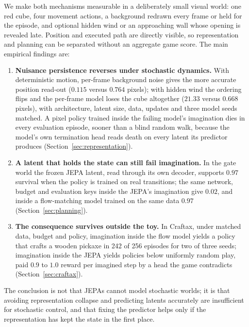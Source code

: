 We make both mechanisms measurable in a deliberately small visual world: one red cube, four
movement actions, a background redrawn every frame or held for the episode, and optional hidden
wind or an approaching wall whose opening is revealed late. Position and executed path are directly
visible, so representation and planning can be separated without an aggregate game score. The main
empirical findings are:
\begin{enumerate}
\item \textbf{Nuisance persistence reverses under stochastic dynamics.} With deterministic motion,
per-frame background noise gives the more accurate position read-out ($0.115$ versus $0.764$
pixels); with hidden wind the ordering flips and the per-frame model loses the cube altogether
($21.33$ versus $0.668$ pixels), with architecture, latent size, data, updates and three model seeds
matched. A pixel policy trained inside the failing model's imagination dies in every evaluation
episode, sooner than a blind random walk, because the model's own termination head reads death on
every latent its predictor produces (Section~\ref{sec:representation}).
\item \textbf{A latent that holds the state can still fail imagination.} In the gate world the
frozen JEPA latent, read through its own decoder, supports $0.97$ survival when the policy is
trained on real transitions; the same network, budget and evaluation keys inside the JEPA's
imagination give $0.02$, and inside a flow-matching model trained on the same data $0.97$
(Section~\ref{sec:planning}).
\item \textbf{The consequence survives outside the toy.} In Craftax, under matched data, budget
and policy, imagination inside the flow model yields a policy that crafts a wooden pickaxe in 242
of 256 episodes for two of three seeds; imagination inside the JEPA yields policies below uniformly
random play, paid $0.9$ to $1.0$ reward per imagined step by a head the game contradicts
(Section~\ref{sec:craftax}).
\end{enumerate}
The conclusion is not that JEPAs cannot model stochastic worlds; it is that avoiding
representation collapse and predicting latents accurately are insufficient for stochastic control,
and that fixing the predictor helps only if the representation has kept the state in the first
place.
